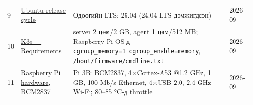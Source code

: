 \begin{longtable}[]{@{}llll@{}}
\begin{minipage}[t]{0.22\columnwidth}
9\strut
\end{minipage} & \begin{minipage}[t]{0.22\columnwidth}\raggedright
\href{https://ubuntu.com/about/release-cycle}{Ubuntu release cycle}\strut
\end{minipage} & \begin{minipage}[t]{0.22\columnwidth}\raggedright
Одоогийн LTS: 26.04 (24.04 LTS дэмжигдсэн)\strut
\end{minipage} & \begin{minipage}[t]{0.22\columnwidth}\raggedright
2026-09\strut
\end{minipage}\tabularnewline
\begin{minipage}[t]{0.22\columnwidth}\raggedright
10\strut
\end{minipage} & \begin{minipage}[t]{0.22\columnwidth}\raggedright
\href{https://docs.k3s.io/installation/requirements}{K3s --- Requirements}\strut
\end{minipage} & \begin{minipage}[t]{0.22\columnwidth}\raggedright
server 2 цөм/2 GB, agent 1 цөм/512 MB; Raspberry Pi OS-д \texttt{cgroup\_\allowbreak{}memory=\allowbreak{}1\ cgroup\_\allowbreak{}enable=\allowbreak{}memory}, \texttt{/\allowbreak{}boot/\allowbreak{}firmware/\allowbreak{}cmdline.\allowbreak{}txt}\strut
\end{minipage} & \begin{minipage}[t]{0.22\columnwidth}\raggedright
2026-09\strut
\end{minipage}\tabularnewline
\begin{minipage}[t]{0.22\columnwidth}\raggedright
11\strut
\end{minipage} & \begin{minipage}[t]{0.22\columnwidth}\raggedright
\href{https://www.raspberrypi.com/documentation/computers/raspberry-pi.html}{Raspberry Pi hardware}, \href{https://www.raspberrypi.com/documentation/computers/processors.html\#bcm2837}{BCM2837}\strut
\end{minipage} & \begin{minipage}[t]{0.22\columnwidth}\raggedright
Pi 3B: BCM2837, 4×Cortex-A53 @1.2 GHz, 1 GB, 100 Mb/s Ethernet, 4×USB 2.0, 2.4 GHz Wi-Fi; 80--85 °C-д throttle\strut
\end{minipage} & \begin{minipage}[t]{0.22\columnwidth}\raggedright
2026-09\strut
\end{minipage}\tabularnewline
\begin{minipage}[t]{0.22\columnwidth}\raggedright

\end{minipage}
\end{longtable}
